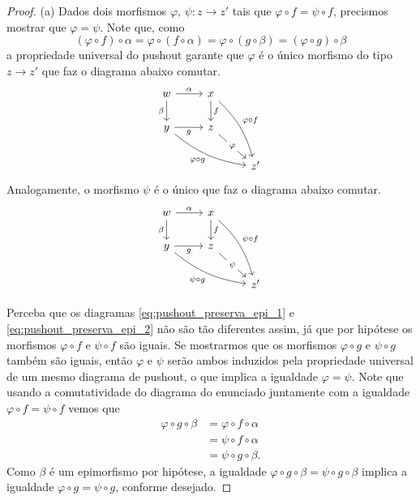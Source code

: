 \begin{proof}
    (a) Dados dois morfismos $\varphi,\, \psi: z \to z'$ tais que $\varphi \circ f = \psi \circ f$, precismos mostrar que $\varphi = \psi$.
    Note que, como
    \begin{displaymath}
      (\varphi \circ f) \circ \alpha
      = \varphi \circ (f \circ \alpha)
      = \varphi \circ (g \circ \beta)
      = (\varphi \circ g) \circ \beta
    \end{displaymath}
     a propriedade universal do pushout garante que $\varphi$ é o único morfismo do tipo $z \to z'$ que faz o diagrama abaixo comutar.
    \begin{equation}\label{eq:pushout_preserva_epi_1}
        \begin{tikzcd}
            w
            \arrow[r, "\alpha"]
            \arrow[d, "\beta" swap]
            & x
            \arrow[d, "f"]
            \arrow[rdd, bend left=15, "\varphi \circ f"]
            \\ y
            \arrow[r, "g" swap]
            \arrow[rrd, bend right=15, "\varphi \circ g" swap]
            & z
            \arrow[rd, "\varphi" description]
            \\ & & z'
        \end{tikzcd}
    \end{equation}
    Analogamente, o morfismo $\psi$ é o único que faz o diagrama abaixo comutar.
    \begin{equation}\label{eq:pushout_preserva_epi_2}
        \begin{tikzcd}
            w
            \arrow[r, "\alpha"]
            \arrow[d, "\beta" swap]
            & x
            \arrow[d, "f"]
            \arrow[rdd, bend left=15, "\psi \circ f"]
            \\ y
            \arrow[r, "g" swap]
            \arrow[rrd, bend right=15, "\psi \circ g" swap]
            & z
            \arrow[rd, "\psi" description]
            \\ & & z'
        \end{tikzcd}
    \end{equation}

    Perceba que os diagramas \eqref{eq:pushout_preserva_epi_1} e \eqref{eq:pushout_preserva_epi_2} não são tão diferentes assim, já que por hipótese os morfismos $\varphi \circ f$ e $\psi \circ f$ são iguais.
    Se mostrarmos que os morfismos $\varphi \circ g$ e $\psi \circ g$ também são iguais, então $\varphi$ e $\psi$ serão ambos induzidos pela propriedade universal de um mesmo diagrama de pushout, o que implica a igualdade $\varphi = \psi$.
    Note que usando a comutatividade do diagrama do enunciado juntamente com a igualdade $\varphi \circ f = \psi \circ f$ vemos que
    \begin{align*}
      \varphi \circ g \circ \beta
      & = \varphi \circ f \circ \alpha \\
      & = \psi \circ f \circ \alpha \\
      & = \psi \circ g \circ \beta.
    \end{align*}
    Como $\beta$ é um epimorfismo por hipótese, a igualdade $\varphi \circ g \circ \beta = \psi \circ g \circ \beta$ implica a igualdade $\varphi \circ g = \psi \circ g$, conforme desejado.


\end{proof}
